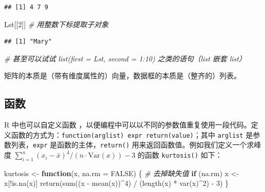 \documentclass[
  b5paper,
  UTF8,twoside]{book}
\newenvironment{Shaded}{\begin{snugshade}}{\end{snugshade}}
\newcommand{\AttributeTok}[1]{\textcolor[rgb]{0.77,0.63,0.00}{#1}}
\newcommand{\CommentTok}[1]{\textcolor[rgb]{0.56,0.35,0.01}{\textit{#1}}}
\newcommand{\ConstantTok}[1]{\textcolor[rgb]{0.00,0.00,0.00}{#1}}
\newcommand{\ControlFlowTok}[1]{\textcolor[rgb]{0.13,0.29,0.53}{\textbf{#1}}}
\newcommand{\DecValTok}[1]{\textcolor[rgb]{0.00,0.00,0.81}{#1}}
\newcommand{\FunctionTok}[1]{\textcolor[rgb]{0.00,0.00,0.00}{#1}}
\newcommand{\NormalTok}[1]{#1}
\newcommand{\OtherTok}[1]{\textcolor[rgb]{0.56,0.35,0.01}{#1}}
\newcommand{\SpecialCharTok}[1]{\textcolor[rgb]{0.00,0.00,0.00}{#1}}
\begin{document}
\begin{verbatim}
## [1] 4 7 9
\end{verbatim}

\begin{Shaded}
\begin{Highlighting}[]
\NormalTok{Lst[[}\DecValTok{2}\NormalTok{]] }\CommentTok{\# 用整数下标提取子对象}
\end{Highlighting}
\end{Shaded}

\begin{verbatim}
## [1] "Mary"
\end{verbatim}

\begin{Shaded}
\begin{Highlighting}[]
\CommentTok{\# 甚至可以试试 list(first = Lst, second = 1:10) 之类的语句（list 嵌套 list）}
\end{Highlighting}
\end{Shaded}

矩阵的本质是（带有维度属性的）向量，数据框的本质是（整齐的）列表。

\hypertarget{ux51fdux6570}{%
\subsection{函数}\label{ux51fdux6570}}

R 中也可以自定义函数 ，以便编程中可以以不同的参数值重复使用一段代码。定义函数的方式为：\texttt{function(arglist)\ expr\ return(value)}；其中 \texttt{arglist} 是参数列表，\texttt{expr} 是函数的主体，\texttt{return()} 用来返回函数值。例如我们定义一个求峰度 \(\sum_{i=1}^{n}(x_{i}-\bar{x})^{4}/(n\cdot\mathrm{Var}(x))-3\) 的函数 \texttt{kurtosis()} 如下：

\begin{Shaded}
\begin{Highlighting}[]
\NormalTok{kurtosis }\OtherTok{\textless{}{-}} \ControlFlowTok{function}\NormalTok{(x, }\AttributeTok{na.rm =} \ConstantTok{FALSE}\NormalTok{) \{}
  \CommentTok{\# 去掉缺失值}
  \ControlFlowTok{if}\NormalTok{ (na.rm) x }\OtherTok{\textless{}{-}}\NormalTok{ x[}\SpecialCharTok{!}\FunctionTok{is.na}\NormalTok{(x)]}
  \FunctionTok{return}\NormalTok{(}\FunctionTok{sum}\NormalTok{((x }\SpecialCharTok{{-}} \FunctionTok{mean}\NormalTok{(x))}\SpecialCharTok{\^{}}\DecValTok{4}\NormalTok{) }\SpecialCharTok{/}\NormalTok{ (}\FunctionTok{length}\NormalTok{(x) }\SpecialCharTok{*} \FunctionTok{var}\NormalTok{(x)}\SpecialCharTok{\^{}}\DecValTok{2}\NormalTok{) }\SpecialCharTok{{-}} \DecValTok{3}\NormalTok{)}
\NormalTok{\}}
\end{Highlighting}
\end{Shaded}
\end{document}
